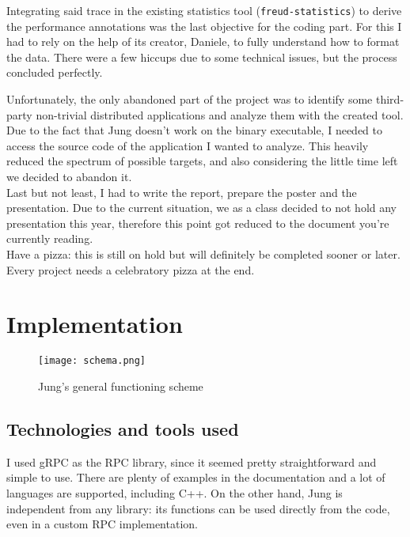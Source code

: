         Integrating said trace in the existing statistics tool (\texttt{freud-statistics}) to derive
        the performance annotations was the last objective for the coding part. For this I had to rely on the
        help of its creator, Daniele, to fully understand how to format the data. There were a few hiccups due to
        some technical issues, but the process concluded perfectly.

        Unfortunately, the only abandoned part of the project was to identify some third-party non-trivial
        distributed applications and analyze them with the created tool. Due to the fact that Jung doesn't work 
        on the binary executable, I needed to access the source code of the application I wanted to 
        analyze. This heavily reduced the spectrum of possible targets, and also considering the little time left we
        decided to abandon it.\\

        Last but not least, I had to write the report, prepare the poster and the presentation. Due to the current
        situation, we as a class decided to not hold any presentation this year, therefore this point got reduced
        to the document you're currently reading.\\
        
        Have a pizza: this is still on hold but will definitely be completed sooner or later. Every project needs
        a celebratory pizza at the end.
        

\chapter{Implementation}

    \begin{figure}[H]
        \centering
        \texttt{[image: schema.png]}
        \caption{Jung's general functioning scheme}
        \label{fig:schema}
    \end{figure}
    

    \section{Technologies and tools used}

        I used gRPC \cite{gRPCdocs} as the RPC library, since it seemed pretty straightforward and simple
        to use. There are plenty of examples in the documentation and a lot of languages are supported,
        including C++. On the other hand, Jung is independent from any library:
        its functions can be used directly from the code, even in a custom RPC implementation.\\

